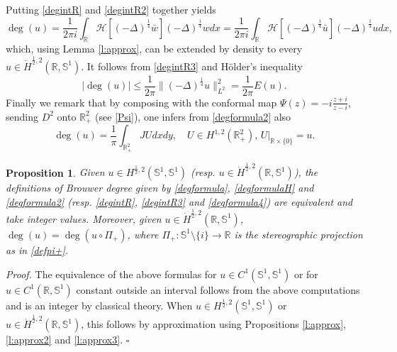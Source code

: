 \documentclass[12pt, a4paper]{article}
\newtheorem{prop}[thm]{Proposition}
\newenvironment{proof}{\noindent\emph{Proof.}}{\hfill$\square$\medskip}
\newcommand{\sph}{\mathbb{S}}
\newcommand{\R}{\mathbb{R}}
\newcommand{\blu}[1]{{\color{blue}#1}}
\renewcommand{\(}{\left(}
\renewcommand{\)}{\right)}
\begin{document}
Putting \eqref{degintR} and \eqref{degintR2} together yields
\begin{equation}\label{degintR3}
\deg(u)=\frac{1}{2\pi i}\int_{\R}\mathcal{H}[(-\Delta)^\frac{1}{4}{\bar w}] (-\Delta)^\frac{1}{4} {w} dx=\frac{1}{2\pi i}\int_{\R}\mathcal{H}[(-\Delta)^\frac{1}{4}\bar u] (-\Delta)^\frac{1}{4} u dx,
\end{equation}
which, using Lemma \ref{l:approx}, can be extended by density to every $u\in \dot H^{\frac12,2}(\R,\sph^1)$.
It follows from \eqref{degintR3} and H\"older's inequality
\begin{equation}\label{stimadegR}
|\deg(u)|\le \frac{1}{2\pi}\|(-\Delta)^\frac14 u\|_{L^2}^2=\frac{1}{2\pi}E(u).
\end{equation}
Finally we remark that by composing with the conformal map $\Psi(z)=-i\frac{z+i}{z-i}$, sending $D^2$ onto $\R^2_+$ (see \eqref{Psi}), one infers from \eqref{degformula2} also
\begin{equation}\label{degformula4}
\deg(u)=\frac{1}{\pi}\int_{\R^2_+}JUdxdy,\quad U\in H^{1,2}(\R^2_+), \, U|_{\R\times\{0\}}=u.
\end{equation}

\begin{prop}\label{p:equivdeg}
Given $u\in H^{\frac12,2}(\sph^1,\sph^1)$ (resp. $u\in \dot H^{\frac12,2}(\R,\sph^1)$), the definitions of Brouwer degree given by \eqref{degformula}, \eqref{degformulaH} and \eqref{degformula2} (resp. \eqref{degintR}, \eqref{degintR3} and \eqref{degformula4}) are equivalent and take integer values. Moreover, given $u\in \dot H^{\frac12,2}(\R,\sph^1)$, $\deg(u)=\deg(u\circ\Pi_+)$, where $\Pi_+: \sph^1\setminus\{i\}\to \R$ is the stereographic projection as in \eqref{defpi+}. %
\end{prop}

\begin{proof}
The equivalence of the above formulas for $u\in C^1(\sph^1,\sph^1)$ or for $u\in C^1(\R,\sph^1)$ constant outside an interval follows from the above computations and is an integer by classical theory. When $u\in H^{\frac{1}{2},2}(\sph^1,\sph^1)$ or $u\in \dot H^{\frac12,2}(\R,\sph^1)$, this follows by approximation using Propositions \ref{l:approx}, \ref{l:approx2} and \ref{l:approx3}.
\end{proof}
\end{document}

